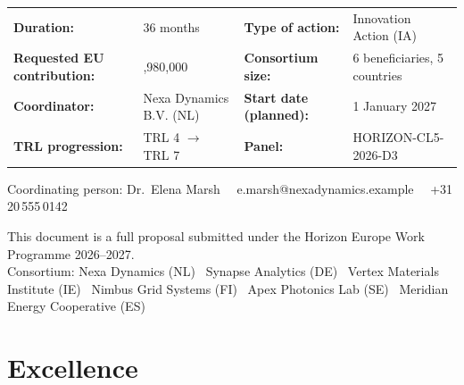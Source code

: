 \documentclass[11pt,a4paper,parskip=half]{scrreprt}
\newcommand{\eur}[1]{\texteuro#1}
\begin{document}
\begin{titlepage}
\begin{center}
\begin{minipage}{0.86\textwidth}
\begin{tcolorbox}[factbox={\faIcon{file}\ \ Proposal Key Facts}]
\small
\renewcommand{\arraystretch}{1.35}
\begin{tabularx}{\linewidth}{@{}l X l X@{}}
\textbf{Duration:} & 36 months & \textbf{Type of action:} & Innovation Action (IA) \\
\textbf{Requested EU contribution:} & \eur{5,980,000} & \textbf{Consortium size:} & 6 beneficiaries, 5 countries \\
\textbf{Coordinator:} & Nexa Dynamics B.V. (NL) & \textbf{Start date (planned):} & 1 January 2027 \\
\textbf{TRL progression:} & TRL 4 $\rightarrow$ TRL 7 & \textbf{Panel:} & HORIZON-CL5-2026-D3 \\
\end{tabularx}
\end{tcolorbox}
\end{minipage}
\end{center}

\vspace{0.9cm}

\begin{center}
\small\sffamily\color{slate}
Coordinating person: Dr.\ Elena Marsh \textbar\ \ e.marsh@nexadynamics.example \textbar\ \ +31\,20\,555\,0142
\end{center}

\vfill

\begin{center}
{\footnotesize\color{slate}\sffamily This document is a full proposal submitted under the Horizon Europe Work Programme 2026--2027.\\
Consortium: Nexa Dynamics (NL) \textbullet\ Synapse Analytics (DE) \textbullet\ Vertex Materials Institute (IE) \textbullet\ Nimbus Grid Systems (FI) \textbullet\ Apex Photonics Lab (SE) \textbullet\ Meridian Energy Cooperative (ES)}
\end{center}

\restoregeometry
\end{titlepage}

\clearpage
\thispagestyle{empty}
\tableofcontents
\clearpage

\chapter{Excellence}
\end{document}
